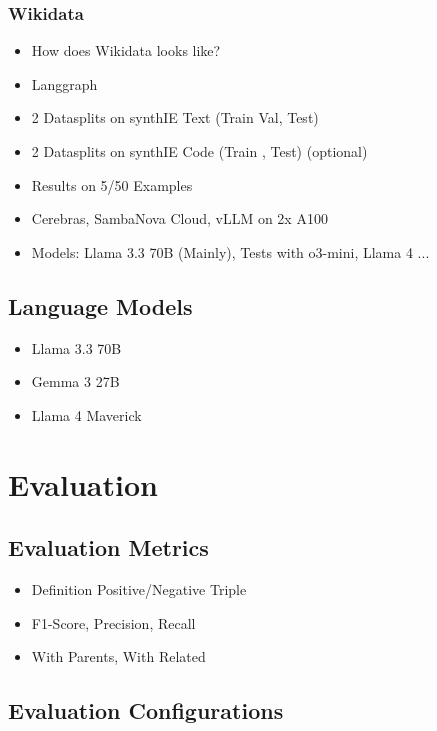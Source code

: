 \documentclass[a4paper,oneside,bibliography=totoc]{scrbook}
\begin{document}
\subsection{Wikidata}
\label{sec:wikidata}
\begin{itemize}
  \item How does Wikidata looks like?
\end{itemize}
\begin{itemize}
  \item Langgraph
  \item 2 Datasplits on synthIE Text (Train Val, Test)
  \item 2 Datasplits on synthIE Code (Train , Test) (optional)
  \item Results on 5/50 Examples
  \item Cerebras, SambaNova Cloud, vLLM on 2x A100
  \item Models: Llama 3.3 70B (Mainly), Tests with o3-mini, Llama 4 ...
\end{itemize}
\section{Language Models}
\begin{itemize}
  \item Llama 3.3 70B
  \item Gemma 3 27B
  \item Llama 4 Maverick
\end{itemize}

\chapter{Evaluation}
\label{ch:evaluation}
\section{Evaluation Metrics}
\label{sec:evaluation_metrics}
\begin{itemize}
  \item Definition Positive/Negative Triple \cite{Josifoski2021}
  \item F1-Score, Precision, Recall
  \item With Parents, With Related
\end{itemize}


\section{Evaluation Configurations}
\label{sec:evaluation_configurations}
\end{document}
